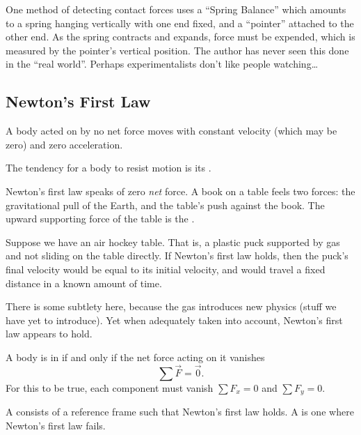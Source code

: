 One method of detecting contact forces uses a ``Spring Balance''%
which amounts to a spring hanging vertically with one end fixed, and a
``pointer'' attached to the other end. As the spring contracts and
expands, force must be expended, which is measured by the pointer's
vertical position. The author has never seen this done in the ``real world''.
Perhaps experimentalists don't like people watching\dots

\subsection{Newton's First Law}

\label{law:newton:first}
A body acted on by no net force moves with constant velocity
(which may be zero) and zero acceleration.

\begin{definition}
The tendency for a body to resist motion is its .
\end{definition}

\M
Newton's first law speaks of zero \emph{net} force. A book on a table
feels two forces: the gravitational pull of the Earth, and the table's
push against the book. The upward supporting force of the table is the
.

Suppose we have an air hockey table. That is, a plastic puck supported
by gas and not sliding on the table directly. If Newton's first law
holds, then the puck's final velocity would be equal to its initial
velocity, and would travel a fixed distance in a known amount of time.

There is some subtlety here, because the gas introduces new physics
(stuff we have yet to introduce). Yet when adequately taken into
account, Newton's first law appears to hold.

\begin{definition}
A body is in  if and only if the net force acting on
it vanishes
\begin{equation}
  \sum\vec{F} = \vec{0}.
\end{equation}
For this to be true, each component must vanish $\sum F_{x}=0$ and $\sum
F_{y}=0$. 
\end{definition}

\begin{definition}
A  consists of a reference frame such
that Newton's first law holds. A 
is one where Newton's first law fails.
\end{definition}


